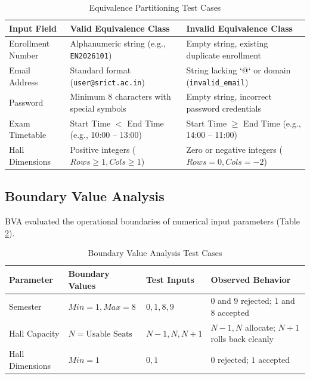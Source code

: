 \documentclass{InternshipReport}
\begin{document}
\begin{table}[H]
\centering
\small
\caption{Equivalence Partitioning Test Cases}
\label{tab:ep_test_cases}
\begin{tabular}{p{} p{} p{}}
\toprule
\textbf{Input Field} & \textbf{Valid Equivalence Class} & \textbf{Invalid Equivalence Class} \\
\midrule
Enrollment Number & Alphanumeric string (e.g., \texttt{EN2026101}) & Empty string, existing duplicate enrollment \\
Email Address & Standard format (\texttt{user@srict.ac.in}) & String lacking `@` or domain (\texttt{invalid\_email}) \\
Password & Minimum 8 characters with special symbols & Empty string, incorrect password credentials \\
Exam Timetable & Start Time $<$ End Time (e.g., 10:00 -- 13:00) & Start Time $\ge$ End Time (e.g., 14:00 -- 11:00) \\
Hall Dimensions & Positive integers ($Rows \ge 1, Cols \ge 1$) & Zero or negative integers ($Rows = 0, Cols = -2$) \\
\bottomrule
\end{tabular}
\end{table}

\subsection{Boundary Value Analysis}
BVA evaluated the operational boundaries of numerical input parameters (Table \ref{tab:bva_test_cases}).

\begin{table}[H]
\centering
\small
\caption{Boundary Value Analysis Test Cases}
\label{tab:bva_test_cases}
\begin{tabular}{p{} p{} p{} p{}}
\toprule
\textbf{Parameter} & \textbf{Boundary Values} & \textbf{Test Inputs} & \textbf{Observed Behavior} \\
\midrule
Semester & $Min=1, Max=8$ & $0, 1, 8, 9$ & $0$ and $9$ rejected; $1$ and $8$ accepted \\
Hall Capacity & $N = \text{Usable Seats}$ & $N-1, N, N+1$ & $N-1, N$ allocate; $N+1$ rolls back cleanly \\
Hall Dimensions & $Min=1$ & $0, 1$ & $0$ rejected; $1$ accepted \\
\bottomrule
\end{tabular}
\end{table}
\end{document}
